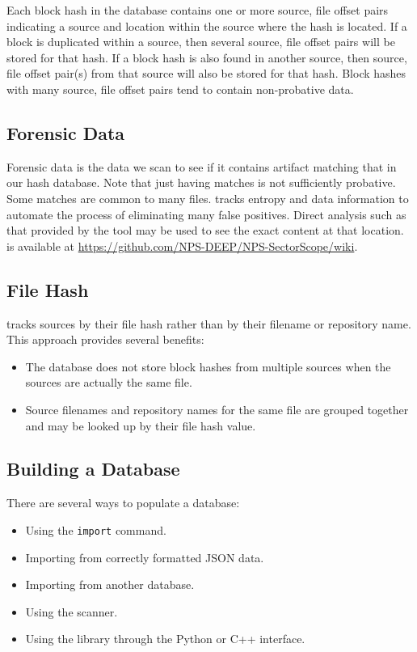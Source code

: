 \documentclass[11pt,fleqn]{article} %
\begin{document}
Each block hash in the database contains one or more source, file offset pairs indicating a source and location within the source where the hash is located.  If a block is duplicated within a source, then several source, file offset pairs will be stored for that hash.  If a block hash is also found in another source, then source, file offset pair(s) from that source will also be stored for that hash. Block hashes with many source, file offset pairs tend to contain non-probative data.

\subsection{Forensic Data}
Forensic data is the data we scan to see if it contains artifact matching
that in our hash database.
Note that just having matches is not sufficiently probative.
Some matches are common to many files.
\hdb tracks entropy and data information to automate the process
of eliminating many false positives.
Direct analysis such as that provided by the \sscope tool
may be used to see the exact content at that location.
\sscope is available at \url{https://github.com/NPS-DEEP/NPS-SectorScope/wiki}.

\subsection{File Hash}
\hdb tracks sources by their file hash rather than by their filename
or repository name.  This approach provides several benefits:

\begin{itemize}
\item The database does not store block hashes from multiple sources
when the sources are actually the same file.
\item Source filenames and repository names for the same file are grouped
together and may be looked up by their file hash value.
\end{itemize}

\subsection{Building a \hdb Database}
There are several ways to populate a database:

\begin{itemize}
\item Using the \hdb \verb+import+ command.
\item Importing from correctly formatted JSON data.
\item Importing from another database.
\item Using the \bulk \hdb scanner.
\item Using the \hdb library through the Python or C++ interface.
\end{itemize}
\end{document}

